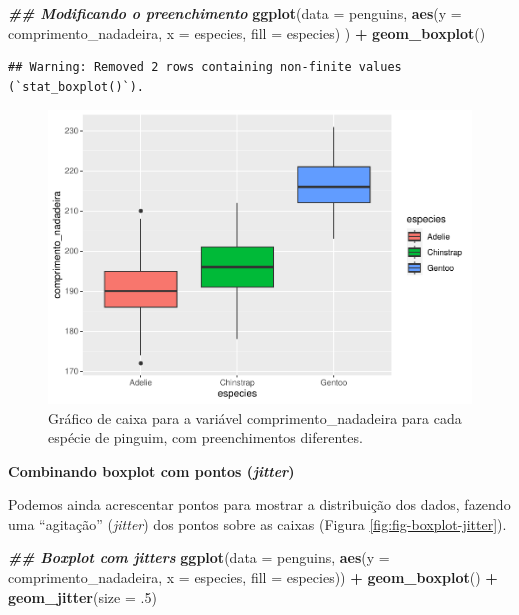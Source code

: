 \documentclass[
]{article}
\newenvironment{Shaded}{\begin{snugshade}}{\end{snugshade}}
\newcommand{\AttributeTok}[1]{\textcolor[rgb]{0.13,0.29,0.53}{#1}}
\newcommand{\DecValTok}[1]{\textcolor[rgb]{0.00,0.00,0.81}{#1}}
\newcommand{\DocumentationTok}[1]{\textcolor[rgb]{0.56,0.35,0.01}{\textbf{\textit{#1}}}}
\newcommand{\FunctionTok}[1]{\textcolor[rgb]{0.13,0.29,0.53}{\textbf{#1}}}
\newcommand{\NormalTok}[1]{#1}
\newcommand{\SpecialCharTok}[1]{\textcolor[rgb]{0.81,0.36,0.00}{\textbf{#1}}}
\begin{document}
\begin{Shaded}
\begin{Highlighting}[]
\DocumentationTok{\#\# Modificando o preenchimento}
\FunctionTok{ggplot}\NormalTok{(}\AttributeTok{data =}\NormalTok{ penguins, }
       \FunctionTok{aes}\NormalTok{(}\AttributeTok{y =}\NormalTok{ comprimento\_nadadeira, }\AttributeTok{x =}\NormalTok{ especies, }\AttributeTok{fill =}\NormalTok{ especies)}
\NormalTok{       ) }\SpecialCharTok{+}
    \FunctionTok{geom\_boxplot}\NormalTok{()}
\end{Highlighting}
\end{Shaded}

\begin{verbatim}
## Warning: Removed 2 rows containing non-finite values (`stat_boxplot()`).
\end{verbatim}

\begin{figure}
\includegraphics[width=0.75\linewidth,height=0.75\textheight]{epr_files/figure-latex/fig-boxplot-cat-1} \caption{Gráfico de caixa para a variável comprimento_nadadeira para cada espécie de pinguim, com preenchimentos diferentes.}\label{fig:fig-boxplot-cat}
\end{figure}

\textbf{Combinando boxplot com pontos (\emph{jitter})}

Podemos ainda acrescentar pontos para mostrar a distribuição dos dados, fazendo uma ``agitação'' (\emph{jitter}) dos pontos sobre as caixas (Figura \ref{fig:fig-boxplot-jitter}).

\begin{Shaded}
\begin{Highlighting}[]
\DocumentationTok{\#\# Boxplot com jitters}
\FunctionTok{ggplot}\NormalTok{(}\AttributeTok{data =}\NormalTok{ penguins, }
       \FunctionTok{aes}\NormalTok{(}\AttributeTok{y =}\NormalTok{ comprimento\_nadadeira, }
           \AttributeTok{x =}\NormalTok{ especies, }
           \AttributeTok{fill =}\NormalTok{ especies)) }\SpecialCharTok{+}
    \FunctionTok{geom\_boxplot}\NormalTok{() }\SpecialCharTok{+}
    \FunctionTok{geom\_jitter}\NormalTok{(}\AttributeTok{size =}\NormalTok{ .}\DecValTok{5}\NormalTok{)}
\end{Highlighting}
\end{Shaded}
\end{document}

